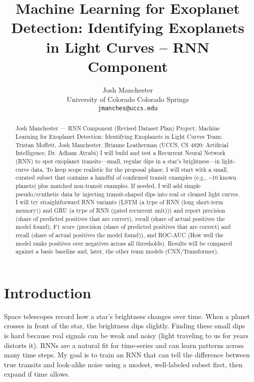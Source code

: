 \documentclass[letterpaper]{article}
\title{Machine Learning for Exoplanet Detection: Identifying Exoplanets in Light Curves -- RNN Component}
\author{Josh Manchester\\
University of Colorado Colorado Springs\\
\texttt{jmanches@uccs.edu}}
\begin{document}
\maketitle

\begin{abstract}
Josh Manchester — RNN Component (Revised Dataset Plan) Project: Machine Learning for Exoplanet Detection: Identifying Exoplanets in Light Curves Team: Tristan Moffett, Josh Manchester, Brianne Leatherman (UCCS, CS 4820: Artificial Intelligence, Dr. Adham Atyabi) I will build and test a Recurrent Neural Network (RNN) to spot exoplanet transits—small, regular dips in a star’s brightness—in light-curve data. To keep scope realistic for the proposal phase, I will start with a small, curated subset that contains a handful of confirmed transit examples (e.g., \textasciitilde{}10 known planets) plus matched non-transit examples. If needed, I will add simple pseudo/synthetic data by injecting transit-shaped dips into real or cleaned light curves. I will try straightforward RNN variants (LSTM (a type of RNN (long short-term memory)) and GRU (a type of RNN (gated recurrent unit))) and report precision (share of predicted positives that are correct), recall (share of actual positives the model found), F1 score (precision (share of predicted positives that are correct) and recall (share of actual positives the model found)), and ROC-AUC (How well the model ranks positives over negatives across all thresholds). Results will be compared against a basic baseline and, later, the other team models (CNN/Transformer).
\end{abstract}

\section{Introduction}
Space telescopes record how a star’s brightness changes over time. When a planet crosses in front of the star, the brightness dips slightly. Finding these small dips is hard because real signals can be weak and noisy (light traveling to us for years distorts it). RNNs are a natural fit for time-series and can learn patterns across many time steps. My goal is to train an RNN that can tell the difference between true transits and look‑alike noise using a modest, well-labeled subset first, then expand if time allows.
\end{document}
